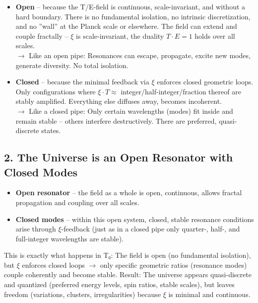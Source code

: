\documentclass[12pt,a4paper]{article}
\begin{document}
	\begin{itemize}[label=$\bullet$]
		\item \textbf{Open} – because the T/E-field is continuous, scale-invariant, and without a hard boundary. There is no fundamental isolation, no intrinsic discretization, and no ''wall'' at the Planck scale or elsewhere. The field can extend and couple fractally – $\xi$ is scale-invariant, the duality $T \cdot E = 1$ holds over all scales. \\
		$\rightarrow$ Like an open pipe: Resonances can escape, propagate, excite new modes, generate diversity. No total isolation.
		
		\item \textbf{Closed} – because the minimal feedback via $\xi$ enforces closed geometric loops. Only configurations where $\xi \cdot T \approx$ integer/half-integer/fraction thereof are stably amplified. Everything else diffuses away, becomes incoherent. \\
		$\rightarrow$ Like a closed pipe: Only certain wavelengths (modes) fit inside and remain stable – others interfere destructively. There are preferred, quasi-discrete states.
	\end{itemize}
	
	\subsection*{2. The Universe is an Open Resonator with Closed Modes}
	
	\begin{itemize}[label=$\bullet$]
		\item \textbf{Open resonator} – the field as a whole is open, continuous, allows fractal propagation and coupling over all scales.
		\item \textbf{Closed modes} – within this open system, closed, stable resonance conditions arise through $\xi$-feedback (just as in a closed pipe only quarter-, half-, and full-integer wavelengths are stable).
	\end{itemize}
	
	This is exactly what happens in T₀: The field is open (no fundamental isolation), but $\xi$ enforces closed loops $\rightarrow$ only specific geometric ratios (resonance modes) couple coherently and become stable. Result: The universe appears quasi-discrete and quantized (preferred energy levels, spin ratios, stable scales), but leaves freedom (variations, clusters, irregularities) because $\xi$ is minimal and continuous.
	
\end{document}
